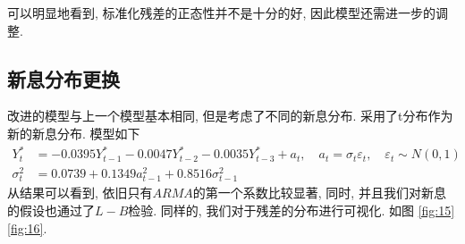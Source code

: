\documentclass[11pt]{article}
\begin{document}
\qquad 可以明显地看到, 标准化残差的正态性并不是十分的好, 因此模型还需进一步的调整.

\subsection{新息分布更换}
\qquad 改进的模型与上一个模型基本相同, 但是考虑了不同的新息分布. 采用了t分布作为新的新息分布. 模型如下
\begin{equation*}\begin{aligned}
    Y_{t}^{*} &=-0.0395 Y_{t-1}^{*}-0.0047 Y_{t-2}^{*}-0.0035 Y_{t-3}^{*}+a_{t}, \quad a_{t}=\sigma_{t} \varepsilon_{t}, \quad \varepsilon_{t} \sim N(0,1) \\
    \sigma_{t}^{2} &=0.0739+ 0.1349 a_{t-1}^{2}+0.8516 \sigma_{t-1}^{2}
\end{aligned}\end{equation*}
\qquad 从结果可以看到, 依旧只有$ARMA$的第一个系数比较显著, 同时, 并且我们对新息的假设也通过了$L-B$检验. 同样的, 我们对于残差的分布进行可视化. 如图 \ref{fig:15} \ref{fig:16}.
\end{document}
